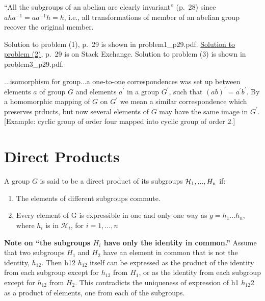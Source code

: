 ``All the subgroups of an abelian are clearly invariant'' (p.\ 28) since $aha^{-1} = aa^{-1}h = h$, i.e., all transformations of member of an abelian group recover the original member.

Solution to problem (1), p.\ 29 is shown in problem1\_p29.pdf. 
\href{https://math.stackexchange.com/questions/84632/subgroup-of-index-2-is-normal}{Solution to problem (2)}, p.\ 29 is on Stack Exchange. Solution to problem (3) is shown in problem3\_p29.pdf.

...isomorphism for group...a one-to-one correspondences was set up
between elements $a$ of group $G$ and elements $a^\prime$ in a group
$G^\prime$, such that $(ab)^\prime = a^\prime b^\prime$. By a
homomorphic mapping of $G$ on $G^\prime$ we mean a similar
correspondence which preserves prducts, but now several elements of
$G$ may have the same image in $G^\prime$. [Example: cyclic group of
  order four mapped into cyclic group of order 2.]

\section{Direct Products}

A group $G$ is said to be a direct product of its subgroups ${\mathcal
  H_{\rm 1},...,H_{\rm n}}$ if:

\begin{enumerate}
\item The elements of different subgroups commute.
\item Every element of G is expressible in one and only one way as
  $g = h_1...h_n$, where $h_i$ is in ${\mathcal H}_i$, for $i = 1,...,n$
\end{enumerate}

{\bf Note on ``the subgroups $H_i$ have only the identity in common.''}
Assume that two subgroups $H_1$ and $H_2$ have an element in common
that is not the identity, $h_{12}$. Then h12 $h_{12}$ itself can be
expressed as the product of the identity from each subgroup except for
$h_{12}$ from $H_1$, or as the identity from each subgroup except for
$h_{12}$ from $H_2$. This contradicts the uniqueness of expression of
h1 $h_{12}$2 as a product of elements, one from each of the subgroups.
